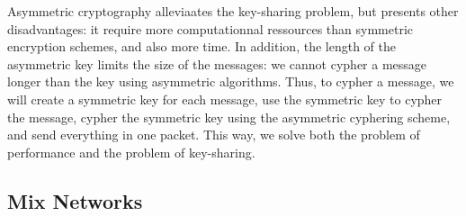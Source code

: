 \documentclass[11pt, a4paper]{article}
\begin{document}
        Asymmetric cryptography alleviaates the key-sharing problem, but presents other disadvantages: it require more computationnal ressources than symmetric encryption schemes, and also more time. In addition, the length of the asymmetric key limits the size of the messages: we cannot cypher a message longer than the key using asymmetric algorithms. Thus, to cypher a message, we will create a symmetric key for each message, use the symmetric key to cypher the message, cypher the symmetric key using the asymmetric cyphering scheme, and send everything in one packet. This way, we solve both the problem of performance and the problem of key-sharing.

    \subsection{Mix Networks}
\end{document}
